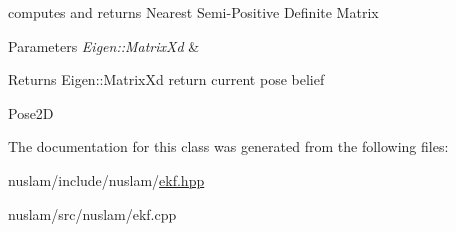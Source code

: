 computes and returns Nearest Semi-\/\+Positive Definite Matrix 


\begin{DoxyParams}{Parameters}
{\em Eigen\+::\+Matrix\+Xd} & \\
\hline
\end{DoxyParams}
\begin{DoxyReturn}{Returns}
Eigen\+::\+Matrix\+Xd return current pose belief 

Pose2D 
\end{DoxyReturn}


The documentation for this class was generated from the following files\+:\begin{DoxyCompactItemize}
\item 
nuslam/include/nuslam/\hyperlink{ekf_8hpp}{ekf.\+hpp}\item 
nuslam/src/nuslam/ekf.\+cpp\end{DoxyCompactItemize}
